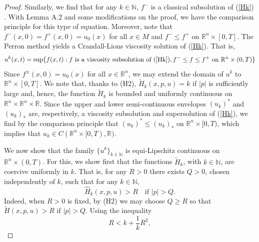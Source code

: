 \documentclass[preprint]{elsarticle}
\numberwithin{equation}{section}
\begin{document}
\begin{proof}
Similarly, we find that for any \( k \in \mathbb{N} \), \( f^- \) is a classical subsolution of (\ref{Hk}) . With \cite{ishii2022hamilton} Lemma A.2 and some modifications on the proof, we have the comparison principle for this type of equation. Moreover, note that \( f^-(x, 0) = f^+(x, 0) = u_0(x) \) for all \( x \in M \) and \( f^- \leq f^+ \) on \( \mathbb R^n \times [0, T] \). The Perron method yields a Crandall-Lions viscosity solution of (\ref{Hk}). That is,
\[u^k(x, t) = \sup\{f(x, t) : f  \text{ is a viscosity subsolution of ($\ref{Hk}$)}, f^- \leq f \leq f^+\text{ on }  \mathbb R^n \times (0, T)\}\]
Since \( f^\pm(x, 0) = u_0(x) \) for all \( x \in  \mathbb R^n \), we may extend the domain of \( u^k \) to \(  \mathbb R^n \times [0, T] \).
We note that, thanks to (H2), \(\tilde{H}_k(x,p,u) = k\) if \(|p|\) is sufficiently large and, hence, the function \(\tilde{H}_k\) is bounded and uniformly continuous on \(\mathbb R^n \times \mathbb R^n \times \mathbb{R}\). Since the upper and lower semi-continuous envelopes \((u_k)^*\) and \((u_k)_*\) are, respectively, a viscosity subsolution and supersolution of (\ref{Hk}), we find by the comparison principle  that \((u_k)^* \leq (u_k)_*\) on \(\mathbb R^n \times [0,T)\), which implies that \(u_k \in C(\mathbb R^n \times [0,T),\mathbb{R})\).

We now show that the family \(\{u^k\}_{k \in \mathbb{N}}\) is equi-Lipschitz continuous on \(\mathbb R^n \times (0,T)\). For this, we show first that the functions \(\tilde{H}_k\), with \(k \in \mathbb{N}\), are coercive uniformly in \(k\). That is, for any \(R > 0\) there exists \(Q > 0\), chosen independently of \(k\), such that for any \(k \in \mathbb{N}\),
\begin{equation}
    \hat{H}_k(x,p,u) > R \quad \text{if } |p| > Q.\label{10}
\end{equation}
Indeed, when \(R > 0\) is fixed, by (H2) we may choose \(Q \geq R\) so that \(\tilde{H}(x,p,u) > R\) if \(|p| > Q\). Using the inequality
\[R < k + \frac{1}{k}R^2,\]


\end{proof}
\end{document}
